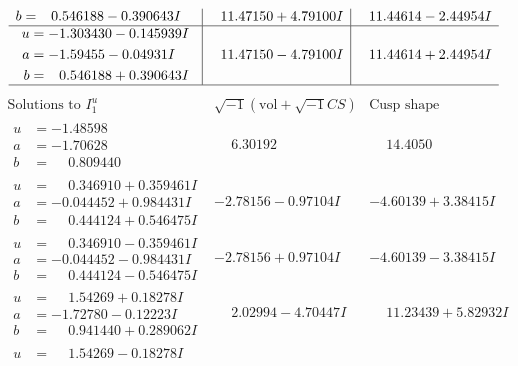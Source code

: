 \documentclass[1p]{elsarticle_modified}
\theoremstyle{definition}
\newcommand{\I}{\sqrt{-1}}
\begin{document}
$$\begin{array}{c|c|c}
\begin{aligned}
b &= \phantom{-}0.546188 - 0.390643 I\end{aligned}
 & \phantom{-}11.47150 + 4.79100 I & \phantom{-}11.44614 - 2.44954 I \\ \hline\begin{aligned}
u &= -1.303430 - 0.145939 I \\
a &= -1.59455 - 0.04931 I \\
b &= \phantom{-}0.546188 + 0.390643 I\end{aligned}
 & \phantom{-}11.47150 - 4.79100 I & \phantom{-}11.44614 + 2.44954 I\\
 \hline 
 \end{array}$$\newpage$$\begin{array}{c|c|c}  
\text{Solutions to }I^u_{1}& \I (\text{vol} + \sqrt{-1}CS) & \text{Cusp shape}\\
 \hline 
\begin{aligned}
u &= -1.48598\phantom{ +0.000000I} \\
a &= -1.70628\phantom{ +0.000000I} \\
b &= \phantom{-}0.809440\phantom{ +0.000000I}\end{aligned}
 & \phantom{-}6.30192\phantom{ +0.000000I} & \phantom{-}14.4050\phantom{ +0.000000I} \\ \hline\begin{aligned}
u &= \phantom{-}0.346910 + 0.359461 I \\
a &= -0.044452 + 0.984431 I \\
b &= \phantom{-}0.444124 + 0.546475 I\end{aligned}
 & -2.78156 - 0.97104 I & -4.60139 + 3.38415 I \\ \hline\begin{aligned}
u &= \phantom{-}0.346910 - 0.359461 I \\
a &= -0.044452 - 0.984431 I \\
b &= \phantom{-}0.444124 - 0.546475 I\end{aligned}
 & -2.78156 + 0.97104 I & -4.60139 - 3.38415 I \\ \hline\begin{aligned}
u &= \phantom{-}1.54269 + 0.18278 I \\
a &= -1.72780 - 0.12223 I \\
b &= \phantom{-}0.941440 + 0.289062 I\end{aligned}
 & \phantom{-}2.02994 - 4.70447 I & \phantom{-}11.23439 + 5.82932 I \\ \hline\begin{aligned}
u &= \phantom{-}1.54269 - 0.18278 I \\

\end{aligned}
\end{array}$$
\end{document}
